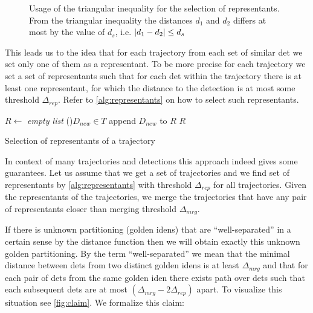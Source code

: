 \begin{figure}
    \centering
    \def\svgwidth{\columnwidth}
    \scalebox{0.6}{}
    \caption[Usage of triangular inequality for the selection of representants]{Usage of the triangular inequality for the selection of representants. From the triangular inequality the distances $d_1$ and $d_2$ differs at most by the value of $d_s$, i.e. $\left|{d_1 - d_2}\right| \leq d_s$}
    \label{fig:triangular}
\end{figure}

This leads us to the idea that for each trajectory from each set of similar \gls{det} we set only one of them as a representant. To be more precise for each trajectory we set a set of representants such that for each \gls{det} within the trajectory there is at least one representant, for which the distance to the detection is at most some threshold $\Delta_{rep}$. Refer to \autoref{alg:representants} on how to select such representants.

\begin{algorithm}

 
 \BlankLine
 $R \leftarrow$ \emph{empty list}\;
 \For(){$D_{new} \in T$}{
  append $D_{new}$ to $R$\;
 }
 \Return $R$
 \caption{Selection of representants of a trajectory}
 \label{alg:representants}
\end{algorithm}

In context of many trajectories and detections this approach indeed gives some guarantees. Let us assume that we get a set of trajectories and we find set of representants by \autoref{alg:representants} with threshold $\Delta_{rep}$ for all trajectories. Given the representants of the trajectories, we merge the trajectories that have any pair of representants closer than merging threshold $\Delta_{mrg}$.

If there is unknown partitioning (golden \glspl{iden}) that are ``well-separated'' in a certain sense by the distance function then we will obtain exactly this unknown golden partitioning. By the term ``well-separated'' we mean that the minimal distance between \glspl{det} from two distinct golden \glspl{iden} is at least $\Delta_{mrg}$ and that for each pair of \glspl{det} from the same golden \gls{iden} there exists path over \glspl{det} such that each subsequent \glspl{det} are at most $(\Delta_{mrg} - 2\Delta_{rep})$ apart. To visualize this situation see \autoref{fig:claim}. We formalize this claim:


